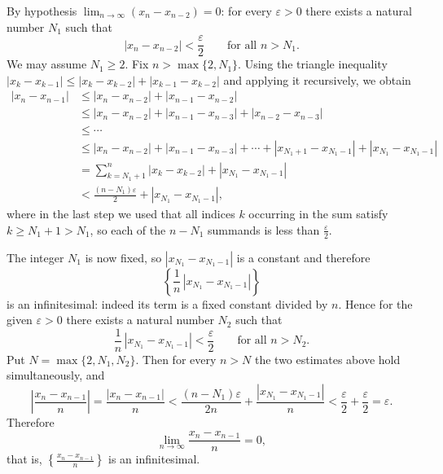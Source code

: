 \documentclass[11pt,a4paper]{article}
\newenvironment{solution}[1]{%
  \par\addvspace{1.7ex}%
  \noindent{\color{solutioncolor}\textbf{#1}}\hspace{0.55em}\ignorespaces}%
  {\par\addvspace{0.9ex}}
\begin{document}
\begin{solution}{Solution 2.1.20}\label{es:2.1.20}
By hypothesis $\lim_{n\to\infty}(x_{n}-x_{n-2})=0$: for every $\varepsilon>0$ there
exists a natural number $N_{1}$ such that
\[
| x_{n}-x_{n-2}|<\frac{\varepsilon}{2}\qquad\text{for all } n>N_{1}.
\]
We may assume $N_{1}\geq 2$. Fix $n>\max\{2,N_{1}\}$. Using the triangle
inequality $|x_{k}-x_{k-1}|\leq|x_{k}-x_{k-2}|+|x_{k-1}-x_{k-2}|$ and applying it
recursively, we obtain
\[
\begin{aligned}
|x_{n}-x_{n-1}|
&\leq |x_{n}-x_{n-2}|+|x_{n-1}-x_{n-2}|\\
&\leq |x_{n}-x_{n-2}|+|x_{n-1}-x_{n-3}|+|x_{n-2}-x_{n-3}|\\
&\leq \cdots\\
&\leq |x_{n}-x_{n-2}|+|x_{n-1}-x_{n-3}|+\cdots+|x_{N_{1}+1}-x_{N_{1}-1}|
   +|x_{N_{1}}-x_{N_{1}-1}|\\
&=\sum_{k=N_{1}+1}^{n}|x_{k}-x_{k-2}|+|x_{N_{1}}-x_{N_{1}-1}|\\
&<\frac{(n-N_{1})\varepsilon}{2}+|x_{N_{1}}-x_{N_{1}-1}|,
\end{aligned}
\]
where in the last step we used that all indices $k$ occurring in the sum satisfy
$k\geq N_{1}+1>N_{1}$, so each of the $n-N_{1}$ summands is less than
$\frac{\varepsilon}{2}$.

The integer $N_{1}$ is now fixed, so $|x_{N_{1}}-x_{N_{1}-1}|$ is a constant and
therefore
\[
\left\{\frac{1}{n}\,|x_{N_{1}}-x_{N_{1}-1}|\right\}
\]
is an infinitesimal: indeed its term is a fixed constant divided by $n$. Hence for
the given $\varepsilon>0$ there exists a natural number $N_{2}$ such that
\[
\frac{1}{n}\,|x_{N_{1}}-x_{N_{1}-1}|<\frac{\varepsilon}{2}\qquad\text{for all }
n>N_{2}.
\]
Put $N=\max\{2,N_{1},N_{2}\}$. Then for every $n>N$ the two estimates above hold
simultaneously, and
\[
\left|\frac{x_{n}-x_{n-1}}{n}\right|
=\frac{|x_{n}-x_{n-1}|}{n}
<\frac{(n-N_{1})\varepsilon}{2n}+\frac{|x_{N_{1}}-x_{N_{1}-1}|}{n}
<\frac{\varepsilon}{2}+\frac{\varepsilon}{2}=\varepsilon .
\]
Therefore
\[
\lim_{n\to\infty}\frac{x_{n}-x_{n-1}}{n}=0,
\]
that is, $\left\{\frac{x_{n}-x_{n-1}}{n}\right\}$ is an infinitesimal.
\end{solution}
\end{document}
